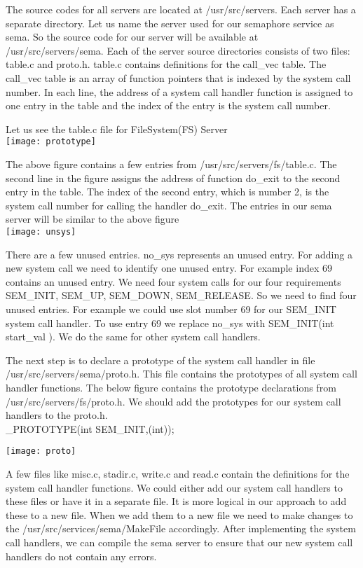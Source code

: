 \documentclass[a4paper,11pt,twocolumn]{article}
\begin{document}
The source codes for all servers are located at /usr/src/servers. Each server has a separate directory. Let us name the server used for our semaphore service as sema. So the source code for our server will be available at /usr/src/servers/sema. Each of the server source directories consists of two files: table.c and proto.h. table.c contains definitions for the call\_vec table. The call\_vec table is an array of function pointers that is indexed by the system call number. In each line, the address of a system call handler function is assigned to one entry in the table and the index of the entry is the system call number.

Let us see the table.c file for FileSystem(FS) Server\\

\texttt{[image: prototype]}

The above figure contains a few entries from /usr/src/servers/fs/table.c. The second line in the figure assigns the address of function do\_exit to the second entry in the table. The index of the second entry, which is number 2, is the system call number for calling the handler do\_exit. The entries in our sema server will be similar to the above figure\\

\texttt{[image: unsys]}

There are a few unused entries. no\_sys represents an unused entry. For adding a new system call we need to identify one unused entry. For example index 69 contains an unused entry. We need four system calls for our four requirements SEM\_INIT, SEM\_UP, SEM\_DOWN, SEM\_RELEASE. So we need to find four unused entries. For example we could use slot number 69 for our SEM\_INIT system call handler. To use entry 69 we replace no\_sys with SEM\_INIT(int start\_val ). We do the same for other system call handlers.

The next step is to declare a prototype of the system call handler in file /usr/src/servers/sema/proto.h. This file contains the prototypes of all system call handler functions. The below figure contains the prototype declarations from /usr/src/servers/fs/proto.h. We should add the prototypes for our system call handlers to the proto.h.\\

\_PROTOTYPE(int SEM\_INIT,(int));

\texttt{[image: proto]}

A few files like misc.c, stadir.c, write.c and read.c contain the definitions for the system call handler functions. We could either add our system call handlers to these files or have it in a separate file. It is more logical in our approach to add these to a new file. When we add them to a new file we need to make changes to the /usr/src/services/sema/MakeFile accordingly. After implementing the system call handlers, we can compile the sema server to ensure that our new system call handlers do not contain any errors.\\
\end{document}
